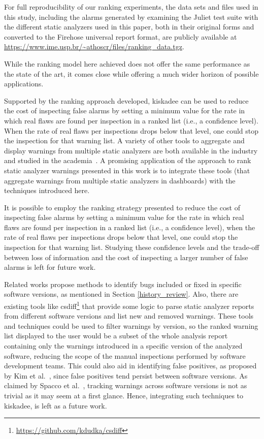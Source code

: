For full reproducibility of our ranking experiments, the data sets and files
used in this study, including the alarms generated by examining the Juliet test
suite with the different static analyzers used in this paper, both in their
original forms and converted to the Firehose universal report format, are
publicly available at
\url{https://www.ime.usp.br/~athoscr/files/ranking_data.tgz}.

While the ranking model here achieved does not offer the same performance as
the state of the art, it comes close while offering a much wider horizon of
possible applications.

Supported by the ranking approach developed, kiskadee can be used to reduce the
cost of inspecting false alarms by setting a minimum value for the rate in
which real flaws are found per inspection in a ranked list (i.e., a confidence
level). When the rate of real flaws per inspections drops below that level, one
could stop the inspection for that warning list. A variety of other tools to
aggregate and display warnings from multiple static analyzers are both
available in the industry and studied in the academia~\cite{buckers2017uav,
heinemann2014teamscale}. A promising application of the approach to rank static
analyzer warnings presented in this work is to integrate these tools (that
aggregate warnings from multiple static analyzers in dashboards) with the
techniques introduced here. 

It is possible to employ the ranking strategy presented to reduce the cost of
inspecting false alarms by setting a minimum value for the rate in which real
flaws are found per inspection in a ranked list (i.e., a confidence level),
when the rate of real flaws per inspections drops below that level, one could
stop the inspection for that warning list. Studying these confidence levels and
the trade-off between loss of information and the cost of inspecting a larger
number of false alarms is left for future work.

Related works propose methods to identify bugs included or fixed in specific
software versions, as mentioned in Section \ref{history_review}.  Also, there
are existing tools like csdiff\footnote{\url{https://github.com/kdudka/csdiff}}
that provide some logic to parse static analyzer reports from different
software versions and list new and removed warnings.  These tools and
techniques could be used to filter warnings by version, so the ranked warning
list displayed to the user would be a subset of the whole analysis report
containing only the warnings introduced in a specific version of the analyzed
software, reducing the scope of the manual inspections performed by software
development teams.  This could also aid in identifying false positives, as
proposed by Kim et al.~\cite{kim_which_2007}, since false positives tend
persist between software versions. As claimed by Spacco et
al.~\cite{spacco_tracking_2006}, tracking warnings across software versions is
not as trivial as it may seem at a first glance. Hence, integrating such techniques
to kiskadee, is left as a future work.

